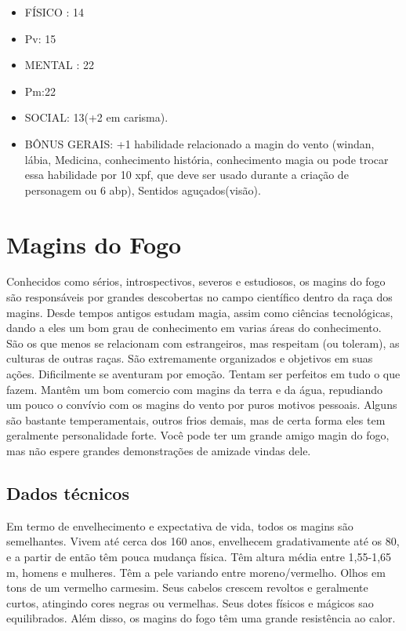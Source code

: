 \begin{itemize}
\item FÍSICO : 14
\item Pv: 15 

\item MENTAL : 22
\item Pm:22

\item SOCIAL: 13(+2 em carisma).

\item BÔNUS GERAIS: +1 habilidade relacionado a magin do vento (windan, lábia, Medicina, conhecimento história, conhecimento magia ou pode trocar essa habilidade por 10 xpf, que deve ser usado durante a criação de personagem ou 6 abp), Sentidos aguçados(visão).

\end{itemize}



\section{Magins do Fogo}

Conhecidos como sérios, introspectivos, severos e estudiosos, os magins do fogo são responsáveis por grandes descobertas no campo científico dentro da raça dos magins. Desde tempos antigos estudam magia, assim como ciências tecnológicas, dando a eles um bom grau de conhecimento em varias áreas do conhecimento. São os que menos se relacionam com estrangeiros, mas respeitam (ou toleram), as culturas de outras raças. São extremamente organizados e objetivos em suas ações. Dificilmente se aventuram por emoção. Tentam ser perfeitos em tudo o que fazem. Mantêm um bom comercio com magins da terra e da água, repudiando um pouco o convívio com os magins do vento por puros motivos pessoais. Alguns são bastante temperamentais, outros frios demais, mas de certa forma eles tem geralmente personalidade forte. Você pode ter um grande amigo magin do fogo, mas não espere grandes demonstrações de amizade vindas dele.

\subsection{Dados técnicos}


Em termo de envelhecimento e expectativa de vida, todos os magins são semelhantes. Vivem até cerca dos 160 anos, envelhecem gradativamente até os 80, e a partir de então têm pouca mudança física. Têm altura média entre 1,55-1,65 m, homens e mulheres. Têm a pele variando entre moreno/vermelho. Olhos em tons de um vermelho carmesim. Seus cabelos crescem revoltos e geralmente curtos, atingindo cores negras ou vermelhas. Seus dotes físicos e mágicos sao equilibrados. Além disso, os magins do fogo têm uma grande resistência ao calor.



